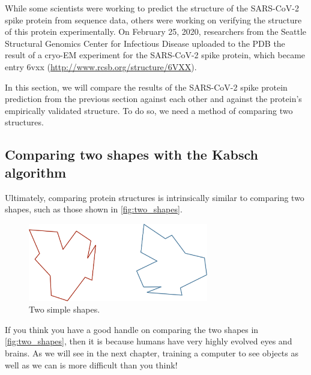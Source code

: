 {{While some scientists were working to predict the structure of the SARS-CoV-2 spike protein from sequence data, others were working on verifying the structure of this protein experimentally. On February 25, 2020, researchers from the Seattle Structural Genomics Center for Infectious Disease uploaded to the PDB the result of a cryo-EM experiment for the SARS-CoV-2 spike protein, which became entry 6vxx (\url{http://www.rcsb.org/structure/6VXX}).

\begin{note}\end{note}

In this section, we will compare the results of the SARS-CoV-2 spike protein prediction from the previous section against each other and against the protein's empirically validated structure. To do so, we need a method of comparing two structures.

\FloatBarrier
{}
\subsection{Comparing two shapes with the Kabsch algorithm}

Ultimately, comparing protein structures is intrinsically similar to comparing two shapes, such as those shown in \autoref{fig:two_shapes}.

\begin{qbox}\end{qbox}

\begin{figure}[h]
	\centering
	\mySfFamily
	\includegraphics[width = 0.7\textwidth]{../images/two_shapes.png}
	\caption{Two simple shapes.}
	\label{fig:two_shapes}
\end{figure}

If you think you have a good handle on comparing the two shapes in \autoref{fig:two_shapes}, then it is because humans have very highly evolved eyes and brains. As we will see in the next chapter, training a computer to see objects as well as we can is more difficult than you think!

}}
